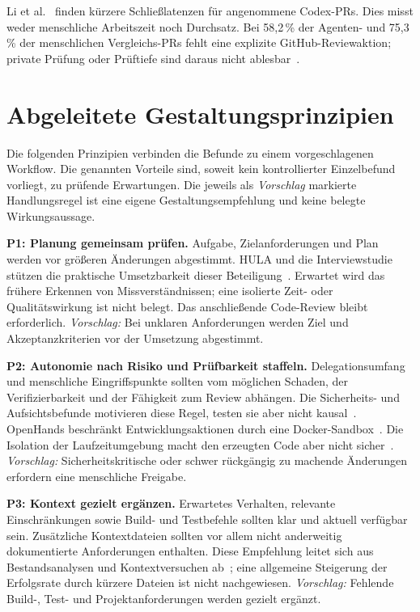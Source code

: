 \documentclass[conference]{IEEEtran}
\begin{document}
Li et al.~\cite{li2025aidev} finden kürzere Schließlatenzen für angenommene Codex-PRs. Dies misst weder menschliche Arbeitszeit noch Durchsatz. Bei 58,2\,\% der Agenten- und 75,3\,\% der menschlichen Vergleichs-PRs fehlt eine explizite GitHub-Reviewaktion; private Prüfung oder Prüftiefe sind daraus nicht ablesbar~\cite{li2025aidev}.

\section{Abgeleitete Gestaltungsprinzipien}
Die folgenden Prinzipien verbinden die Befunde zu einem vorgeschlagenen Workflow. Die genannten Vorteile sind, soweit kein kontrollierter Einzelbefund vorliegt, zu prüfende Erwartungen. Die jeweils als \emph{Vorschlag} markierte Handlungsregel ist eine eigene Gestaltungsempfehlung und keine belegte Wirkungsaussage.

\textbf{P1: Planung gemeinsam prüfen.}
Aufgabe, Zielanforderungen und Plan werden vor größeren Änderungen abgestimmt. HULA und die Interviewstudie stützen die praktische Umsetzbarkeit dieser Beteiligung~\cite{takerngsaksiri2025hula,dhanorkar2026oversight}. Erwartet wird das frühere Erkennen von Missverständnissen; eine isolierte Zeit- oder Qualitätswirkung ist nicht belegt. Das anschließende Code-Review bleibt erforderlich. \emph{Vorschlag:} Bei unklaren Anforderungen werden Ziel und Akzeptanzkriterien vor der Umsetzung abgestimmt.

\textbf{P2: Autonomie nach Risiko und Prüfbarkeit staffeln.}
Delegationsumfang und menschliche Eingriffspunkte sollten vom möglichen Schaden, der Verifizierbarkeit und der Fähigkeit zum Review abhängen. Die Sicherheits- und Aufsichtsbefunde motivieren diese Regel, testen sie aber nicht kausal~\cite{sajadi2025patchsecurity,dhanorkar2026oversight}. OpenHands beschränkt Entwicklungsaktionen durch eine Docker-Sandbox~\cite{wang2025openhands}. Die Isolation der Laufzeitumgebung macht den erzeugten Code aber nicht sicher~\cite{sajadi2025patchsecurity}. \emph{Vorschlag:} Sicherheitskritische oder schwer rückgängig zu machende Änderungen erfordern eine menschliche Freigabe.

\textbf{P3: Kontext gezielt ergänzen.}
Erwartetes Verhalten, relevante Einschränkungen sowie Build- und Testbefehle sollten klar und aktuell verfügbar sein. Zusätzliche Kontextdateien sollten vor allem nicht anderweitig dokumentierte Anforderungen enthalten. Diese Empfehlung leitet sich aus Bestandsanalysen und Kontextversuchen ab~\cite{mohsenimofidi2026context,gloaguen2026agentsmd}; eine allgemeine Steigerung der Erfolgsrate durch kürzere Dateien ist nicht nachgewiesen. \emph{Vorschlag:} Fehlende Build-, Test- und Projektanforderungen werden gezielt ergänzt.
\end{document}
